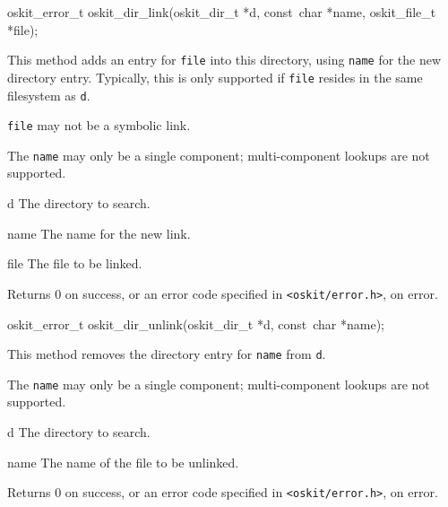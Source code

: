 \begin{apisyn}

	\funcproto oskit_error_t
	oskit_dir_link(oskit_dir_t *d, const~char *name, 
	              oskit_file_t *file); 
\end{apisyn}
\ostofs
\begin{apidesc}
	This method adds an entry for {\tt file} into this directory,
	using {\tt name} for the new directory entry.
	Typically, this is only supported if {\tt file}
	resides in the same filesystem as {\tt d}.

	{\tt file} may not be a symbolic link.  

	The {\tt name} may only be a single component;
	multi-component lookups are not supported.
\end{apidesc}
\begin{apiparm}
	\item[d]
		The directory to search.
	\item[name]
		The name for the new link.
	\item[file]
		The file to be linked.
\end{apiparm}
\begin{apiret}
	Returns 0 on success, or an error code specified in
	{\tt <oskit/error.h>}, on error.
\end{apiret}


\begin{apisyn}

	\funcproto oskit_error_t
	oskit_dir_unlink(oskit_dir_t *d, const~char *name); 
\end{apisyn}
\ostofs
\begin{apidesc}
	This method removes the directory entry for {\tt name}
	from {\tt d}.

	The {\tt name} may only be a single component;
	multi-component lookups are not supported.
\end{apidesc}
\begin{apiparm}
	\item[d]
		The directory to search.
	\item[name]
		The name of the file to be unlinked.
\end{apiparm}
\begin{apiret}
	Returns 0 on success, or an error code specified in
	{\tt <oskit/error.h>}, on error.
\end{apiret}



